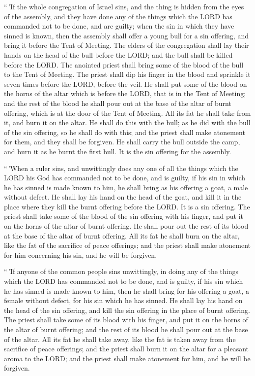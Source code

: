 ``\,'If the whole congregation of Israel sins, and the
thing is hidden from the eyes of the assembly, and they have done any of
the things which the LORD has commanded not to be done, and are guilty;
 when the sin in which they have sinned is known, then
the assembly shall offer a young bull for a sin offering, and bring it
before the Tent of Meeting.  The elders of the
congregation shall lay their hands on the head of the bull before the
LORD; and the bull shall be killed before the LORD.  The
anointed priest shall bring some of the blood of the bull to the Tent of
Meeting.  The priest shall dip his finger in the blood
and sprinkle it seven times before the LORD, before the veil.
 He shall put some of the blood on the horns of the altar
which is before the LORD, that is in the Tent of Meeting; and the rest
of the blood he shall pour out at the base of the altar of burnt
offering, which is at the door of the Tent of Meeting. 
All its fat he shall take from it, and burn it on the altar.
 He shall do this with the bull; as he did with the bull
of the sin offering, so he shall do with this; and the priest shall make
atonement for them, and they shall be forgiven.  He shall
carry the bull outside the camp, and burn it as he burnt the first bull.
It is the sin offering for the assembly.

 ``\,'When a ruler sins, and unwittingly does any one of
all the things which the LORD his God has commanded not to be done, and
is guilty,  if his sin in which he has sinned is made
known to him, he shall bring as his offering a goat, a male without
defect.  He shall lay his hand on the head of the goat,
and kill it in the place where they kill the burnt offering before the
LORD. It is a sin offering.  The priest shall take some
of the blood of the sin offering with his finger, and put it on the
horns of the altar of burnt offering. He shall pour out the rest of its
blood at the base of the altar of burnt offering.  All
its fat he shall burn on the altar, like the fat of the sacrifice of
peace offerings; and the priest shall make atonement for him concerning
his sin, and he will be forgiven.

 ``\,'If anyone of the common people sins unwittingly, in
doing any of the things which the LORD has commanded not to be done, and
is guilty,  if his sin which he has sinned is made known
to him, then he shall bring for his offering a goat, a female without
defect, for his sin which he has sinned.  He shall lay
his hand on the head of the sin offering, and kill the sin offering in
the place of burnt offering.  The priest shall take some
of its blood with his finger, and put it on the horns of the altar of
burnt offering; and the rest of its blood he shall pour out at the base
of the altar.  All its fat he shall take away, like the
fat is taken away from the sacrifice of peace offerings; and the priest
shall burn it on the altar for a pleasant aroma to the LORD; and the
priest shall make atonement for him, and he will be forgiven.

